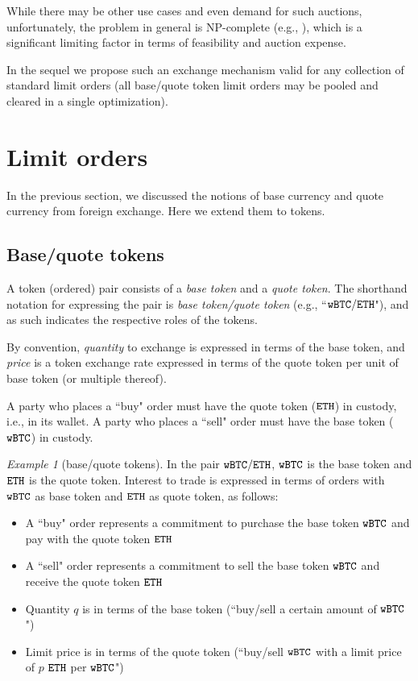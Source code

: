 \documentclass[11pt, reqno]{amsart}
\theoremstyle{definition}
\theoremstyle{remark}
\newtheorem{exmp}{Example}[subsection]
\newcommand{\BTC}{\textnormal{\texttt{wBTC}}}
\newcommand{\ETH}{\textnormal{\texttt{ETH}}}
\begin{document}
While there may be other use cases and even demand for such auctions,
unfortunately, the problem in general is NP-complete (e.g., \cite{XiStWh05}),
which is a significant limiting factor in terms of feasibility and
auction expense.

In the sequel we propose such an exchange mechanism valid for any collection
of standard limit orders (all base/quote token limit orders may be pooled and
cleared in a single optimization).

\section{Limit orders}
In the previous section, we discussed the notions of base currency and
quote currency from foreign exchange. Here we extend them to tokens.

\subsection{Base/quote tokens}
A token (ordered) pair consists of a \emph{base token} and a
\emph{quote token}. The shorthand notation for expressing the pair is
\emph{base token/quote token} (e.g., ``$\BTC/\ETH$"), and as such indicates the
respective roles of the tokens.

By convention, \emph{quantity} to exchange is expressed in terms of the base
token, and \emph{price} is a token exchange rate expressed in terms of the
quote token per unit of base token (or multiple thereof).

A party who places a ``buy" order must have the quote token ($\ETH$) in custody,
i.e., in its wallet. A party who places a ``sell" order must have the base
token ($\BTC$) in custody.

\begin{exmp}[base/quote tokens]
In the pair $\BTC/\ETH$, $\BTC$ is the base token and $\ETH$
is the quote token. Interest to trade is expressed in terms of orders
with $\BTC$ as base token and $\ETH$ as quote token, as follows:
\begin{itemize}
    \item A ``buy" order represents a commitment to purchase the base token
          $\BTC$ and pay with the quote token $\ETH$
    \item A ``sell" order represents a commitment to sell the base token
          $\BTC$ and receive the quote token $\ETH$
    \item Quantity $q$ is in terms of the base token (``buy/sell a certain
          amount of $\BTC$")
    \item Limit price is in terms of the quote token (``buy/sell $\BTC$ with a
          limit price of $p$ $\ETH$ per $\BTC$")
\end{itemize}
\end{exmp}
\end{document}
